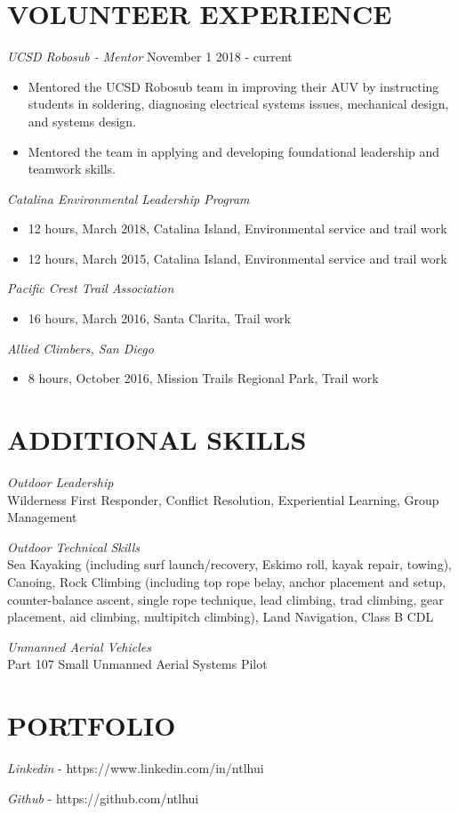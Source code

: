 \documentclass[line,margin]{res}
\begin{document}
\begin{resume}
\section{VOLUNTEER EXPERIENCE}
	{\sl UCSD Robosub - Mentor} \hfill November 1 2018 - current
		\begin{itemize}
			\item Mentored the UCSD Robosub team in improving their AUV by instructing students in soldering, diagnosing electrical systems issues, mechanical design, and systems design.
			\item Mentored the team in applying and developing foundational leadership and teamwork skills.
		\end{itemize}
	{\sl Catalina Environmental Leadership Program}
		\begin{itemize}
			\item 12 hours, March 2018, Catalina Island, Environmental service and trail work
			\item 12 hours, March 2015, Catalina Island, Environmental service and trail work
		\end{itemize}

	{\sl Pacific Crest Trail Association}
		\begin{itemize}
			\item 16 hours, March 2016, Santa Clarita, Trail work
		\end{itemize}

	{\sl Allied Climbers, San Diego}
		\begin{itemize}
			\item 8 hours, October 2016, Mission Trails Regional Park, Trail work
		\end{itemize}

\section{ADDITIONAL SKILLS}
	{\sl Outdoor Leadership}\\
		Wilderness First Responder, Conflict Resolution, Experiential Learning, Group Management

	{\sl Outdoor Technical Skills}\\
		Sea Kayaking (including surf launch/recovery, Eskimo roll, kayak repair, towing), Canoing, Rock Climbing (including top rope belay, anchor placement and setup, counter-balance ascent, single rope technique, lead climbing, trad climbing, gear placement, aid climbing, multipitch climbing), Land Navigation, Class B CDL

	{\sl Unmanned Aerial Vehicles}\\
		Part 107 Small Unmanned Aerial Systems Pilot

\section{PORTFOLIO}
	{\sl Linkedin} - https://www.linkedin.com/in/ntlhui

	{\sl Github} - https://github.com/ntlhui
\end{resume}
\end{document}

